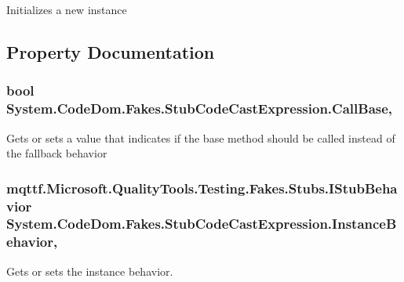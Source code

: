 Initializes a new instance



\subsection{Property Documentation}
\hypertarget{class_system_1_1_code_dom_1_1_fakes_1_1_stub_code_cast_expression_a7e1a7dcc0e8053966c8dd52b6f445316}{
\subsubsection[{Call\-Base}]{\setlength{\rightskip}{0pt plus 5cm}bool System.\-Code\-Dom.\-Fakes.\-Stub\-Code\-Cast\-Expression.\-Call\-Base\hspace{0.3cm}{\ttfamily [get]}, {\ttfamily [set]}}}\label{class_system_1_1_code_dom_1_1_fakes_1_1_stub_code_cast_expression_a7e1a7dcc0e8053966c8dd52b6f445316}


Gets or sets a value that indicates if the base method should be called instead of the fallback behavior

\hypertarget{class_system_1_1_code_dom_1_1_fakes_1_1_stub_code_cast_expression_ad889d5b3bf493513788efe7c7381ad18}{
\subsubsection[{Instance\-Behavior}]{\setlength{\rightskip}{0pt plus 5cm}mqttf.\-Microsoft.\-Quality\-Tools.\-Testing.\-Fakes.\-Stubs.\-I\-Stub\-Behavior System.\-Code\-Dom.\-Fakes.\-Stub\-Code\-Cast\-Expression.\-Instance\-Behavior\hspace{0.3cm}{\ttfamily [get]}, {\ttfamily [set]}}}\label{class_system_1_1_code_dom_1_1_fakes_1_1_stub_code_cast_expression_ad889d5b3bf493513788efe7c7381ad18}


Gets or sets the instance behavior.

